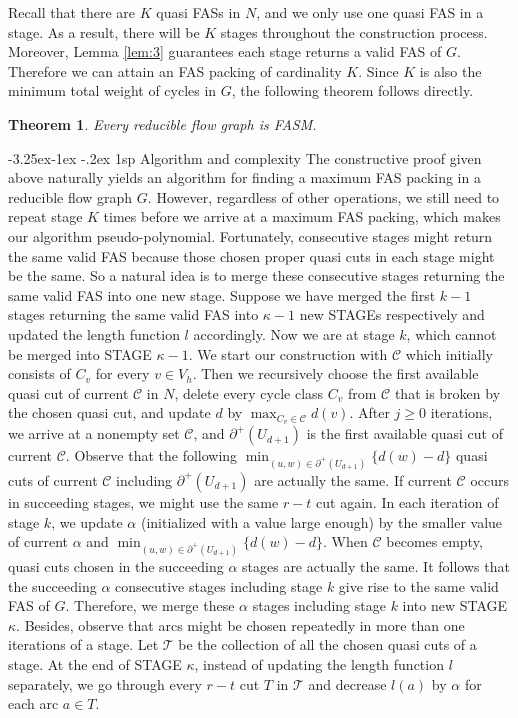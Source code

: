 \documentclass[11pt]{article}
\makeatletter
\newtheorem{theorem}{Theorem}[section]
\renewcommand\subsection{%
  \@startsection{subsection}{2}
                {\z@}%
                {-3.25ex\@plus -1ex \@minus -.2ex}%
                {1sp}%
                {\normalsize\bfseries}%
}
\makeatother
\begin{document}
Recall that there are $K$ quasi FASs in $N$, and we only use one quasi FAS in a stage. As a result, there will be $K$ stages throughout the construction process. Moreover, Lemma \ref{lem:3} guarantees each stage returns a valid FAS of $G$. Therefore we can attain an FAS packing of cardinality $K$. Since $K$ is also the minimum total weight of cycles in $G$, the following theorem follows directly.

\begin{theorem}
\label{thm:4}
Every reducible flow graph is FASM.
\end{theorem}

\subsection{Algorithm and complexity}
\label{sec:5}
The constructive proof given above naturally yields an algorithm for finding a maximum FAS packing in a reducible flow graph $G$. However, regardless of other operations, we still need to repeat stage $K$ times before we arrive at a maximum FAS packing, which makes our algorithm pseudo-polynomial. Fortunately, consecutive stages might return the same valid FAS because those chosen proper quasi cuts in each stage might be the same. So a natural idea is to merge these consecutive stages returning the same valid FAS into one new stage.  
Suppose we have merged the first $k-1$ stages returning the same valid FAS into $\kappa-1$ new STAGEs respectively and updated the length function $l$ accordingly. Now we are at stage $k$, which cannot be merged into STAGE $\kappa-1$. We start our construction with $\mathcal{C}$ which initially consists of $C_v$ for every $v\in V_h$. Then we recursively choose the first available quasi cut of current $\mathcal{C}$ in $N$, delete every cycle class $C_v$ from $\mathcal{C}$ that is broken by the chosen quasi cut, and update $d$ by $\max_{C_v\in\mathcal{C}} d(v)$. After $j\geq 0$ iterations, we arrive at a nonempty set $\mathcal{C}$, and $\partial^+(U_{d+1})$ is the first available quasi cut of current $\mathcal{C}$. Observe that the following $\min_{(u,w)\in\partial^+(U_{d+1})}\{d(w)-d\}$ quasi cuts of current $\mathcal{C}$ including $\partial^+(U_{d+1})$ are actually the same. If current $\mathcal{C}$ occurs in succeeding stages, we might use the same $r-t$ cut again. In each iteration of stage $k$, we update $\alpha$ (initialized with a value large enough) by the smaller value of current $\alpha$ and $\min_{(u,w)\in\partial^+(U_{d+1})}\{d(w)-d\}$. When $\mathcal{C}$ becomes empty, quasi cuts chosen in the succeeding $\alpha$ stages are actually the same. It follows that the succeeding $\alpha$ consecutive stages including stage $k$ give rise to the same valid FAS of $G$. Therefore, we merge these $\alpha$ stages including stage $k$ into new STAGE $\kappa$. Besides, observe that arcs might be chosen repeatedly in more than one iterations of a stage. Let $\mathcal{T}$ be the collection of all the chosen quasi cuts of a stage. At the end of STAGE $\kappa$, instead of updating the length function $l$ separately, we go through every $r-t$ cut $T$ in $\mathcal{T}$ and decrease $l(a)$ by $\alpha$ for each arc $a\in T$.
\end{document}
